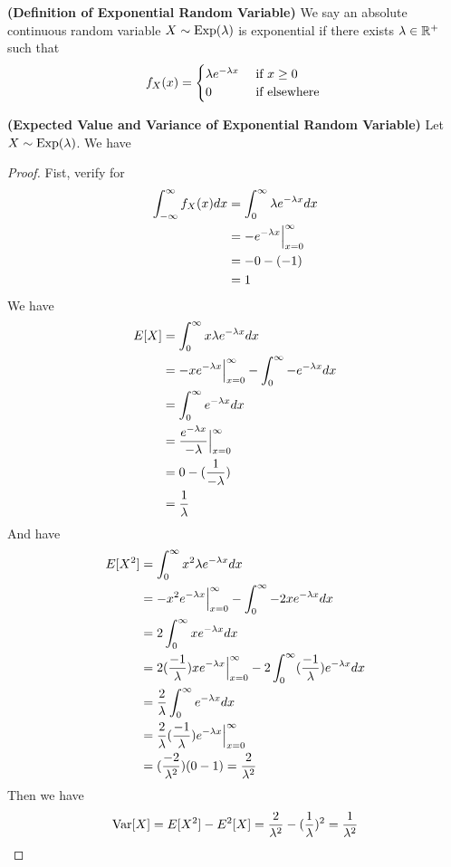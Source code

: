 \documentclass{report}
\begin{document}
\begin{definition}
\label{2.3.3}
\textbf{(Definition of Exponential Random Variable)} We say an absolute continuous random variable $X\sim \text{Exp}(\lambda )$ is exponential if there exists $\lambda\in\mathbb{R}^+$ such that
\begin{equation}
f_X(x)=\begin{cases}
  \lambda e^{-\lambda x}& \text{ if $x\geq 0$ }\\
  0& \text{ if elsewhere }
\end{cases}
\end{equation}
\end{definition}
\begin{theorem}
\label{2.3.4}
\textbf{(Expected Value and Variance of Exponential Random Variable)} Let $X\sim \text{Exp}(\lambda )$. We have 
\end{theorem}
\begin{proof}
Fist, verify for
\begin{align}
\int_{-\infty}^\infty f_X(x)dx&=\int_{0}^\infty \lambda e^{-\lambda x}dx\\
                              &=-e^{-\lambda x}\Big |_{x=0}^\infty\\
                              &=-0-(-1)\\
                              &=1
\end{align}
We have
\begin{align}
E[X]&=\int_0^\infty x\lambda e^{-\lambda x}dx\\
&=-xe^{-\lambda x}\Big |_{x=0}^\infty -\int_0^\infty -e^{-\lambda x}dx\\
&=\int_0^\infty e^{-\lambda x}dx\\
&=\frac{e^{-\lambda x}}{-\lambda } \Big |_{x=0}^\infty\\
&=0-(\frac{1}{-\lambda })\\
&=\frac{1}{\lambda }
\end{align}
And have
\begin{align}
E[X^2]&=\int_0^\infty x^2\lambda e^{-\lambda x}dx\\
&=-x^2e^{-\lambda x}\Big |_{x=0}^\infty-\int_0^\infty -2xe^{-\lambda x}dx\\
&=2\int_0^\infty xe^{-\lambda x}dx\\
&=2(\frac{-1}{\lambda })xe^{-\lambda x}\Big |_{x=0}^\infty -2\int_0^\infty (\frac{-1}{\lambda })e^{-\lambda x}dx\\
&=\frac{2}{\lambda }\int_{0}^\infty e^{-\lambda x}dx\\
&=\frac{2}{\lambda }(\frac{-1}{\lambda })e^{-\lambda x}\Big |_{x=0}^\infty\\
&=(\frac{-2}{\lambda ^2})(0-1)=\frac{2}{\lambda ^2}
\end{align}
Then we have
\begin{equation}
\text{Var} [X]=E[X^2]-E^2[X]=\frac{2}{\lambda^2}-(\frac{1}{\lambda })^2=\frac{1}{\lambda ^2}
\end{equation}
\end{proof}
\end{document}
